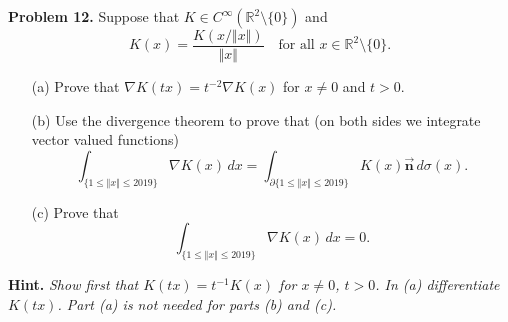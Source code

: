 \documentclass[12pt,leqno]{amsart}
\theoremstyle{definition}
\begin{document}
\noindent
{\bf Problem 12.}
Suppose that $K\in C^\infty(\mathbb{R}^2\setminus \{ 0\})$ and
$$
K(x)=\frac{K(x/\Vert x\Vert)}{\Vert x\Vert}
\quad
\text{for all $x\in\mathbb{R}^2\setminus\{0\}$.}
$$
\begin{itemize}
	\item[(a)] Prove that $\nabla K(tx)=t^{-2}\nabla K(x)$ for $x\neq 0$ and $t>0$.
	\item[(b)] Use the divergence theorem to prove that (on both sides we integrate vector valued functions)
	$$
	\int_{\{1\leq \Vert x\Vert\leq 2019\}} \nabla K(x)\, dx=
	\int_{\partial \{1\leq \Vert x\Vert\leq 2019\}} K(x)\vec{\mathbf{n}}\, d\sigma(x).
	$$
	\item[(c)] Prove that
	$$
	\int_{\{1\leq \Vert x\Vert\leq 2019\}} \nabla K(x)\, dx=0.
	$$
\end{itemize}
{\bf Hint.} {\em Show first that
	$K(tx)=t^{-1}K(x)$ for $x\neq 0$, $t>0$. In (a) differentiate $K(tx)$. Part (a) is not needed for parts (b) and (c).}
\end{document}
